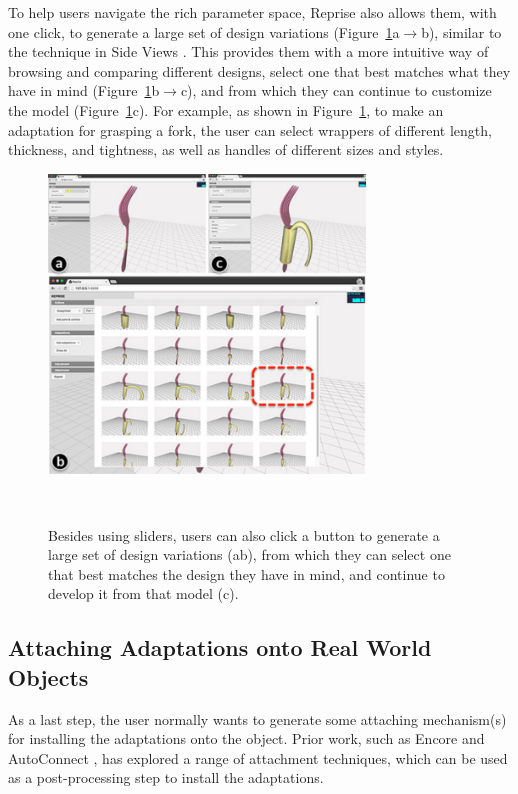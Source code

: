 To help users navigate the rich parameter space, Reprise also allows them, with one click, to generate a large set of design variations (Figure~\ref{fig:reprise_all_designs}a$\rightarrow$b), similar to the technique in Side Views \cite{terry2002side}. This provides them with a more intuitive way of browsing and comparing different designs, select one that best matches what they have in mind (Figure~\ref{fig:reprise_all_designs}b$\rightarrow$c), and from which they can continue to customize the model (Figure~\ref{fig:reprise_all_designs}c). For example, as shown in Figure~\ref{fig:reprise_all_designs}, to make an adaptation for grasping a fork, the user can select wrappers of different length, thickness, and tightness, as well as handles of different sizes and styles.

\begin{figure}[h!]
  \vskip 5pt
  \centering
  \includegraphics[width=0.75\textwidth]{figures/reprise_all_designs_v2.pdf}
  \caption{Besides using sliders, users can also click a button to generate a large set of design variations (ab), from which they can select one that best matches the design they have in mind, and continue to develop it from that model (c).}~\label{fig:reprise_all_designs}
\end{figure}

\subsection{Attaching Adaptations onto Real World Objects}
As a last step, the user normally wants to generate some attaching mechanism(s) for installing the adaptations onto the object. Prior work, such as Encore \cite{chen2015encore} and AutoConnect \cite{koyama2015autoconnect}, has explored a range of attachment techniques, which can be used as a post-processing step to install the adaptations. 

